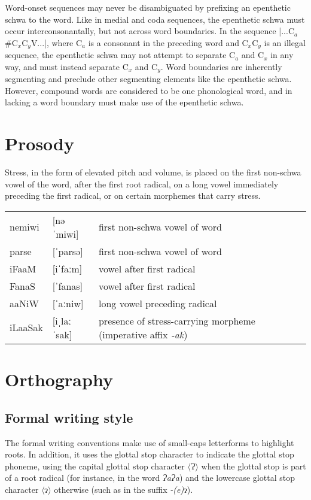 \documentclass[a4paper,10pt,twoside,openright]{memoir}
\newcommand{\longv}{ː}
\newcommand{\sqbrack}[1]{$\langle$#1$\rangle$}
\newcommand{\bigglot}{Ɂ}
\newcommand{\lilglot}{ɂ}
\newcommand\famword[1]{{\addfontfeatures{Letters=UppercaseSmallCaps}#1}}
\begin{document}
Word-onset sequences may never be disambiguated by prefixing an epenthetic schwa to the word. Like in medial and coda sequences, the epenthetic schwa must occur interconsonantally, but not across word boundaries. In the sequence |...C$_a$\#C$_x$C$_y$V...|, where C$_a$ is a consonant in the preceding word and C$_x$C$_y$ is an illegal sequence, the epenthetic schwa may not attempt to separate C$_a$ and C$_x$ in any way, and must instead separate C$_x$ and C$_y$. Word boundaries are inherently segmenting and preclude other segmenting elements like the epenthetic schwa. However, compound words are considered to be one phonological word, and in lacking a word boundary must make use of the epenthetic schwa.

\section{Prosody}

Stress, in the form of elevated pitch and volume, is placed on the first non-schwa vowel of the word, after the first root radical, on a long vowel immediately preceding the first radical, or on certain morphemes that carry stress.

\begin{table}[ht]
    \begin{tabular}{lll}
        nemiwi & [nəˈmiwi] & first non-schwa vowel of word\\
        parse & [ˈparsə] & first non-schwa vowel of word\\
        \famword{iFaaM} & [iˈfa{\longv}m] & vowel after first radical\\
        \famword{FanaS} & [ˈfanas] & vowel after first radical\\
        \famword{aaNiW}& [ˈa{\longv}niw] & long vowel preceding radical\\
        \famword{iLaaSak} & [iˌla{\longv}ˈsak] & presence of stress-carrying morpheme (imperative affix \emph{-ak})
    \end{tabular}
\end{table}


\section{Orthography}
\subsection{Formal writing style}

The formal writing conventions make use of small-caps letterforms to highlight roots. In addition, it uses the glottal stop character to indicate the glottal stop phoneme, using the capital glottal stop character \sqbrack{\bigglot} when the glottal stop is part of a root radical (for instance, in the word \textit{\bigglot a\bigglot a}) and the lowercase glottal stop character \sqbrack{\lilglot} otherwise (such as in the suffix \textit{-(e)}\lilglot).
\end{document}
